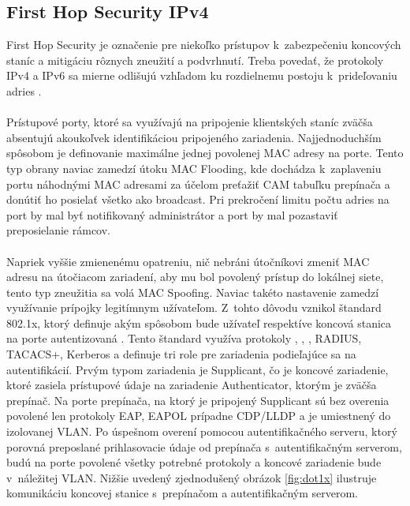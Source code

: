 \subsection{First Hop Security IPv4}
First Hop Security je označenie pre niekoľko prístupov k~zabezpečeniu koncových staníc a mitigáciu rôznych zneužití a podvrhnutí. Treba povedať, že protokoly IPv4 a IPv6 sa mierne odlišujú vzhľadom ku rozdielnemu postoju k~prideľovaniu adries \cite{Satrapa2019}.
\\\\   
\noindent
Prístupové porty, ktoré sa využívajú na pripojenie klientských staníc zväčša absentujú akoukoľvek identifikáciou pripojeného zariadenia. Najjednoduchším spôsobom je definovanie maximálne jednej povolenej MAC adresy na porte. Tento typ obrany naviac zamedzí útoku MAC Flooding, kde dochádza k~zaplaveniu portu náhodnými MAC adresami za účelom preťažiť CAM tabuľku prepínača a donútiť ho posielať všetko ako broadcast. Pri prekročení limitu počtu adries na port by mal byť notifikovaný administrátor a port by mal pozastaviť preposielanie rámcov.
\\\\   
\noindent
Napriek vyššie zmienenému opatreniu, nič nebráni útočníkovi zmeniť MAC adresu na útočiacom zariadení, aby mu bol povolený prístup do lokálnej siete, tento typ zneužitia sa volá MAC Spoofing. Naviac takéto nastavenie zamedzí využívanie prípojky legitímnym užívateľom. Z~tohto dôvodu vznikol štandard 802.1x, ktorý definuje akým spôsobom bude užívateľ respektíve koncová stanica na porte autentizovaná \cite{Vyncke2008}. Tento štandard využíva protokoly , , , RADIUS, TACACS+, Kerberos a definuje tri role pre zariadenia podieľajúce sa na autentifikácií. Prvým typom zariadenia je Supplicant, čo je koncové zariadenie, ktoré zasiela prístupové údaje na zariadenie Authenticator, ktorým je zväčša prepínač. Na porte prepínača, na ktorý je pripojený Supplicant sú bez overenia povolené len protokoly EAP, EAPOL prípadne CDP/LLDP a je umiestnený do izolovanej VLAN. Po úspešnom overení pomocou autentifikačného serveru, ktorý porovná preposlané prihlasovacie údaje od prepínača s~autentifikačným serverom, budú na porte povolené všetky potrebné protokoly a koncové zariadenie bude v~náležitej VLAN. Nižšie uvedený zjednodušený obrázok \ref{fig:dot1x} ilustruje komunikáciu koncovej stanice s~prepínačom a autentifikačným serverom.  


